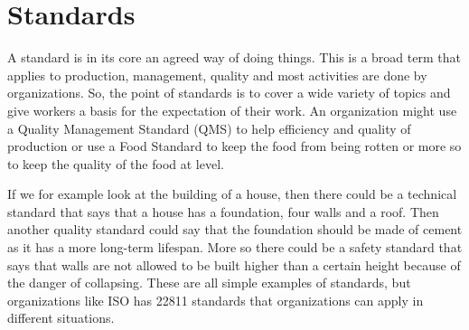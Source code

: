 \section{Standards}
A standard is in its core an agreed way of doing things. This is a broad term that applies to production, management, quality and most activities are done by organizations. So, the point of standards is to cover a wide variety of topics and give workers a basis for the expectation of their work. An organization might use a Quality Management Standard (QMS) to help efficiency and quality of production or use a Food Standard to keep the food from being rotten or more so to keep the quality of the food at level.

If we for example look at the building of a house, then there could be a technical standard that says that a house has a foundation, four walls and a roof. Then another quality standard could say that the foundation should be made of cement as it has a more long-term lifespan. More so there could be a safety standard that says that walls are not allowed to be built higher than a certain height because of the danger of collapsing. These are all simple examples of standards, but organizations like ISO has 22811 standards that organizations can apply in different situations.
